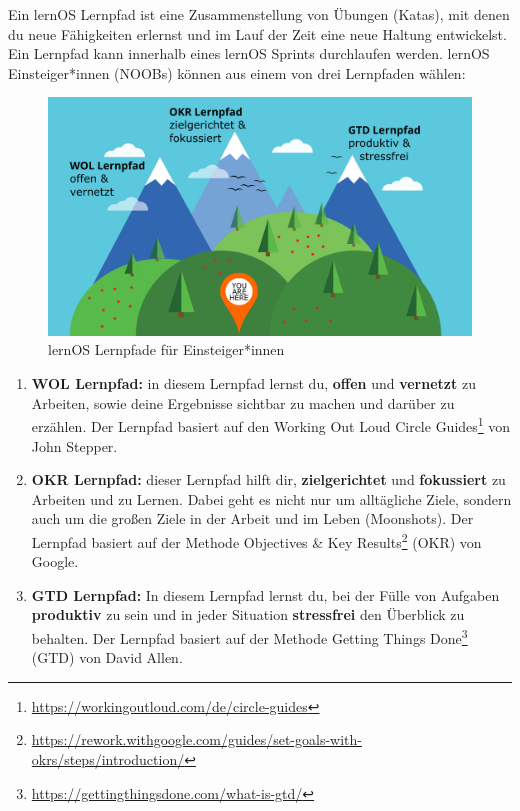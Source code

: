 \documentclass[
  ngerman,
  paper=a4,
,captions=tableheading
]{scrartcl}
\DeclareRobustCommand{\href}[2]{#2\footnote{\url{#1}}}
\providecommand{\tightlist}{%
  \setlength{\itemsep}{0pt}\setlength{\parskip}{0pt}}
\begin{document}
Ein lernOS Lernpfad ist eine Zusammenstellung von Übungen (Katas), mit
denen du neue Fähigkeiten erlernst und im Lauf der Zeit eine neue
Haltung entwickelst. Ein Lernpfad kann innerhalb eines lernOS Sprints
durchlaufen werden. lernOS Einsteiger*innen (NOOBs) können aus einem von
drei Lernpfaden wählen:

\begin{figure}
\centering
\includegraphics{./tex2pdf.-c0ed5a8631023970/c587d0e577abadd8b4876e8bdf99260f63e71cf7.png}
\caption{lernOS Lernpfade für Einsteiger*innen}
\end{figure}

\begin{enumerate}
\def\labelenumi{\arabic{enumi}.}
\tightlist
\item
  \textbf{WOL Lernpfad:} in diesem Lernpfad lernst du, \textbf{offen}
  und \textbf{vernetzt} zu Arbeiten, sowie deine Ergebnisse sichtbar zu
  machen und darüber zu erzählen. Der Lernpfad basiert auf den
  \href{https://workingoutloud.com/de/circle-guides}{Working Out Loud
  Circle Guides} von John Stepper.
\item
  \textbf{OKR Lernpfad:} dieser Lernpfad hilft dir,
  \textbf{zielgerichtet} und \textbf{fokussiert} zu Arbeiten und zu
  Lernen. Dabei geht es nicht nur um alltägliche Ziele, sondern auch um
  die großen Ziele in der Arbeit und im Leben (Moonshots). Der Lernpfad
  basiert auf der Methode
  \href{https://rework.withgoogle.com/guides/set-goals-with-okrs/steps/introduction/}{Objectives
  \& Key Results} (OKR) von Google.
\item
  \textbf{GTD Lernpfad:} In diesem Lernpfad lernst du, bei der Fülle von
  Aufgaben \textbf{produktiv} zu sein und in jeder Situation
  \textbf{stressfrei} den Überblick zu behalten. Der Lernpfad basiert
  auf der Methode
  \href{https://gettingthingsdone.com/what-is-gtd/}{Getting Things Done}
  (GTD) von David Allen.
\end{enumerate}
\end{document}
